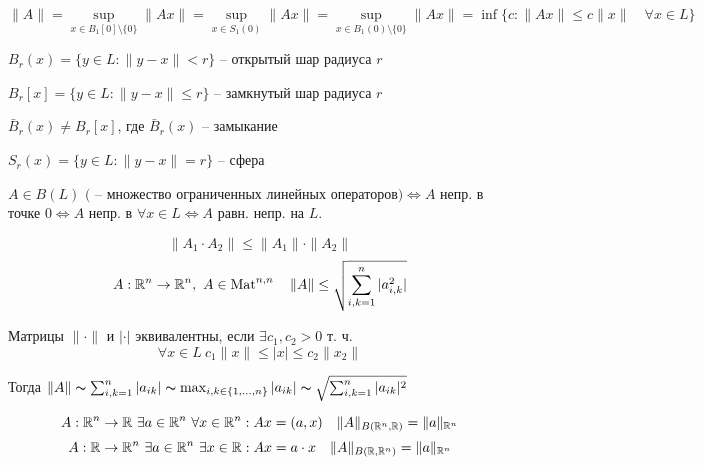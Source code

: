     \begin{proposition}
        \[
            \| A \| = \sup_{x \in B_1[0] \setminus \{ 0 \}} \|Ax \| = 
            \sup_{x \in S_1(0)} \| Ax \| = 
            \sup_{x \in B_1(0) \setminus \{ 0 \}} \|Ax\| = 
            \inf \{c : \| Ax \| \le c \| x \| \quad \forall x \in L \}
        \]
        \par$B_r(x) = \{ y \in L  : \| y - x \| < r\}$ -- открытый шар радиуса $r$
        \par$B_r[x] = \{ y \in L  : \| y - x \| \le r\}$ -- замкнутый шар радиуса $r$
        \par$\bar B_r(x) \not= B_r[x]$, где $\bar B_r(x)$ -- замыкание
        \par$S_r(x) = \{ y \in L  : \| y - x \| = r\}$ -- сфера
    \end{proposition}

    \begin{proposition}
        $A \in B(L) \text{ ( -- множество ограниченных линейных операторов)} \Leftrightarrow A$ непр. в точке $0 \Leftrightarrow A$ непр. в $\forall x \in L \Leftrightarrow A$ равн. непр. на $L$.
    \end{proposition}

    \begin{remark}
        \[
            \| A_1 \cdot A_2 \| \le \| A_1 \| \cdot \| A_2 \|   
        \]
        \[
            A : \mathbb{R}^n \rightarrow \mathbb{R}^n, \ A \in \operatorname{Mat}^{n, n} \quad \| A \| \leq \sqrt{\sum_{i, k = 1}^n |a_{i, k}^2|}
        \]
    \end{remark}

    \begin{definition}
        Матрицы $\|\cdot\|$ и $|\cdot|$ эквивалентны, если $\exists c_1, c_2 > 0$ т. ч.
        \[
            \forall x \in L \ c_1 \|x\| \le |x| \le c_2 \|x_2\|
        \]
        \par Тогда $\| A \| \thicksim \sum_{i, k = 1}^n |a_{ik}| \thicksim \max_{i, k \in \{1, \dots, n\}} |a_{ik}| \thicksim \sqrt{\sum_{i, k = 1}^n |a_{ik}|^2}$
    \end{definition}

    \begin{remark}
        \[
            A : \R^n  \rightarrow \R \ \exists a \in \R^n \ \forall x \in \R^n : Ax = (a, x) \quad \| A \|_{B(\R^n, \R)} = \| a \|_{\R^n}  %
        \]
        \[
            A : \mathbb{R} \rightarrow \mathbb{R}^n \ \exists a \in \mathbb{R}^n \ \exists x \in \mathbb{R} : Ax = a \cdot x \quad \| A \|_{B(\mathbb{R}, \mathbb{R}^n)} = \| a \|_{\mathbb{R}^n}  
        \]
    \end{remark}


